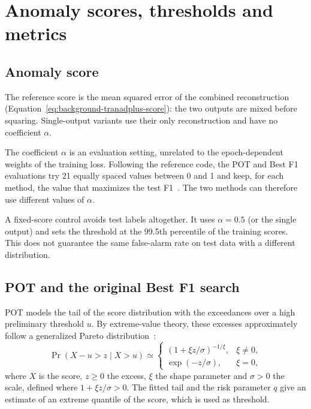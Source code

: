 \section{Anomaly scores, thresholds and metrics}
\label{sec:datasets-metrics}

\subsection{Anomaly score}
\label{sec:datasets-scoring}

The reference score is the mean squared error of the combined reconstruction
(Equation~\eqref{eq:background-tranadplus-score}): the two outputs are mixed
before squaring. Single-output variants use their only reconstruction and
have no coefficient \(\alpha\).

The coefficient \(\alpha\) is an evaluation setting, unrelated to the
epoch-dependent weights of the training loss. Following the reference
code, the \ac{POT} and Best F1 evaluations try \num{21} equally spaced values
between \num{0} and \num{1} and keep, for each method, the value that
maximizes the test F1~\cite{TranADPlusReferenceCode}. The two methods can
therefore use different values of \(\alpha\).

A fixed-score control avoids test labels altogether. It uses \(\alpha=0.5\)
(or the single output) and sets the threshold at the \num{99.5}th percentile
of the training scores. This does not guarantee the same false-alarm rate
on test data with a different distribution.

\subsection{POT and the original Best F1 search}
\label{sec:datasets-original-thresholds}

\ac{POT} models the tail of the score distribution with the exceedances over
a high preliminary threshold \(u\). By extreme-value theory, these excesses
approximately follow a generalized Pareto distribution~\cite{Siffer2017POT}:
\begin{equation}
  \Pr(X-u>z\mid X>u)
  \simeq
  \begin{cases}
    \left(1+\xi z/\sigma\right)^{-1/\xi}, & \xi\ne0,\\
    \exp(-z/\sigma), & \xi=0,
  \end{cases}
  \label{eq:datasets-gpd}
\end{equation}
where \(X\) is the score, \(z\geq0\) the excess, \(\xi\) the shape parameter
and \(\sigma>0\) the scale, defined where \(1+\xi z/\sigma>0\). The fitted
tail and the risk parameter \(q\) give an estimate of an extreme quantile
of the score, which is used as threshold.

